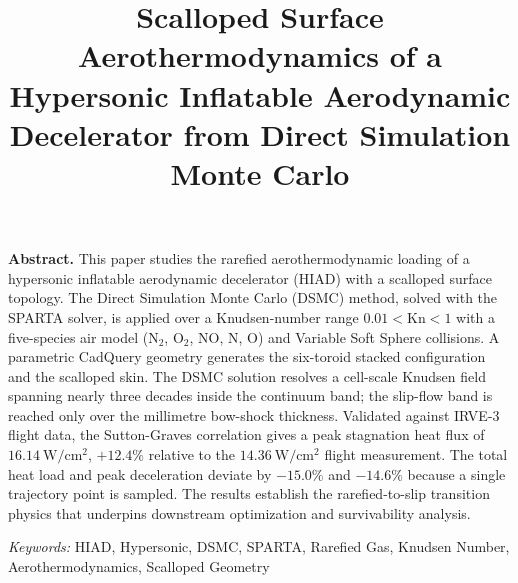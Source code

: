 \documentclass[conference]{IEEEtran}
\begin{document}
\title{Scalloped Surface Aerothermodynamics of a Hypersonic Inflatable Aerodynamic Decelerator from Direct Simulation Monte Carlo}

\author{
}

\maketitle

\noindent\textbf{Abstract.}\quad
This paper studies the rarefied aerothermodynamic loading of a hypersonic inflatable aerodynamic decelerator (HIAD) with a scalloped surface topology. The Direct Simulation Monte Carlo (DSMC) method, solved with the SPARTA solver, is applied over a Knudsen-number range $0.01 < \mathrm{Kn} < 1$ with a five-species air model (N$_2$, O$_2$, NO, N, O) and Variable Soft Sphere collisions. A parametric CadQuery geometry generates the six-toroid stacked configuration and the scalloped skin. The DSMC solution resolves a cell-scale Knudsen field spanning nearly three decades inside the continuum band; the slip-flow band is reached only over the millimetre bow-shock thickness. Validated against IRVE-3 flight data, the Sutton-Graves correlation gives a peak stagnation heat flux of $16.14~\mathrm{W/cm^2}$, $+12.4\%$ relative to the $14.36~\mathrm{W/cm^2}$ flight measurement. The total heat load and peak deceleration deviate by $-15.0\%$ and $-14.6\%$ because a single trajectory point is sampled. The results establish the rarefied-to-slip transition physics that underpins downstream optimization and survivability analysis.
\par\vspace{0.5em}

\noindent\textit{Keywords:}\quad
HIAD, Hypersonic, DSMC, SPARTA, Rarefied Gas, Knudsen Number, Aerothermodynamics, Scalloped Geometry
\par\vspace{1em}
\end{document}
